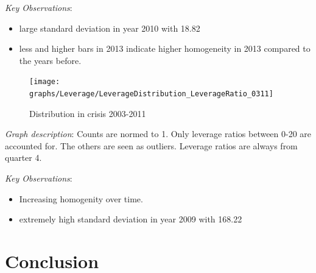 \documentclass[12pt, a4paper]{article} %
\begin{document}
\noindent \textit{Key Observations}:
\begin{itemize}
\item large standard deviation in year 2010 with 18.82
\item less and higher bars in 2013 indicate higher homogeneity in 2013 compared to the years before.
\end{itemize}

\pagebreak


\begin{figure}[hbtp]
\centering
\caption{Distribution in crisis 2003-2011}
\texttt{[image: graphs/Leverage/LeverageDistribution\_LeverageRatio\_0311]}
\end{figure}

\noindent \textit{Graph description}: Counts are normed to 1. Only leverage ratios between 0-20 are accounted for. The others are seen as outliers. Leverage ratios are always from quarter 4.

\noindent \textit{Key Observations}:
\begin{itemize}
\item Increasing homogenity over time.
\item extremely high standard deviation in year 2009 with 168.22
\end{itemize}


\section{Conclusion}





\newpage
\printbibliography[
heading=bibintoc,
title={Bibliography}
]



\end{document}

